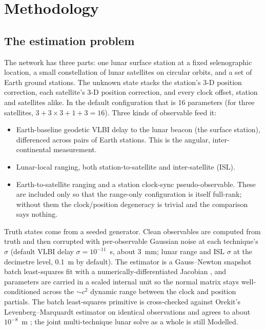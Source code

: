 \section{Methodology}

\subsection{The estimation problem}

The network has three parts: one lunar surface station at a fixed selenographic
location, a small constellation of lunar satellites on circular orbits, and a
set of Earth ground stations. The unknown state stacks the station's 3-D position
correction, each satellite's 3-D position correction, and every clock offset,
station and satellites alike. In the default configuration that is 16 parameters
(for three satellites, $3 + 3\times3 + 1 + 3 = 16$). Three kinds of observable
feed it:

\begin{itemize}
  \item Earth-baseline geodetic VLBI delay to the lunar beacon (the surface
    station), differenced across pairs of Earth stations. This is the angular,
    inter-continental measurement.
  \item Lunar-local ranging, both station-to-satellite and inter-satellite
    (ISL).
  \item Earth-to-satellite ranging and a station clock-sync pseudo-observable.
    These are included only so that the range-only configuration is itself
    full-rank; without them the clock/position degeneracy is trivial and the
    comparison says nothing.
\end{itemize}

Truth states come from a seeded generator. Clean observables are computed from
truth and then corrupted with per-observable Gaussian noise at each technique's
$\sigma$ (default VLBI delay $\sigma = 10^{-11}$~s, about 3~mm; lunar range and
ISL $\sigma$ at the decimetre level, 0.1~m by default). The estimator is a
Gauss--Newton snapshot batch least-squares fit with a numerically-differentiated
Jacobian \citep{montenbruck2000}, and parameters are carried in a scaled
internal unit so the normal matrix stays well-conditioned across the ${\sim}c^2$
dynamic range between the clock and position partials. The batch least-squares
primitive is cross-checked against Orekit's Levenberg--Marquardt estimator on
identical observations and agrees to about $10^{-8}$~m \citep{orekit}; the joint
multi-technique lunar solve as a whole is still Modelled.

